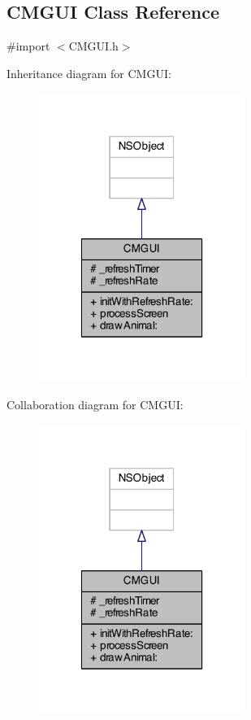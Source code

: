 \subsection{C\-M\-G\-U\-I Class Reference}
\label{interface_c_m_g_u_i}


{\ttfamily \#import $<$C\-M\-G\-U\-I.\-h$>$}



Inheritance diagram for C\-M\-G\-U\-I\-:
\nopagebreak
\begin{figure}[H]
\begin{center}
\leavevmode
\includegraphics[width=190pt]{interface_c_m_g_u_i__inherit__graph}
\end{center}
\end{figure}


Collaboration diagram for C\-M\-G\-U\-I\-:
\nopagebreak
\begin{figure}[H]
\begin{center}
\leavevmode
\includegraphics[width=190pt]{interface_c_m_g_u_i__coll__graph}
\end{center}
\end{figure}
